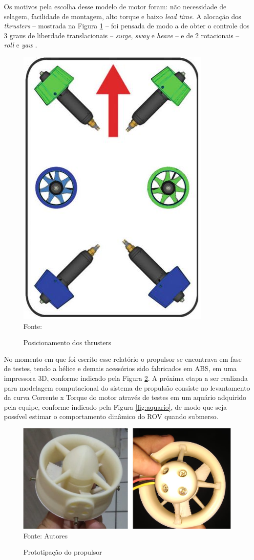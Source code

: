 Os motivos pela escolha desse modelo de motor foram: não necessidade de selagem, facilidade de montagem, alto torque e baixo \textit{lead time}. A alocação dos \textit{thrusters} -- mostrada na Figura \ref{fig:posicionamento-thrusters} -- foi pensada de modo a de obter o controle dos 3 graus de liberdade translacionais -- \textit{surge}, \textit{sway} e \textit{heave}  -- e de 2 rotacionais  -- \textit{roll} e \textit{yaw} \cite{Antonelli2018}.

\begin{figure}[h]
	\centering
	\caption{Posicionamento dos thrusters}
	\label{fig:posicionamento-thrusters}
	\includegraphics[width=0.25\linewidth]{images/alocacao-motores}\\
	\footnotesize Fonte: \cite{Antonelli2018}
\end{figure}


No momento em que foi escrito esse relatório o propulsor se encontrava em fase de testes, tendo a hélice e demais acessórios sido fabricados em ABS, em uma impressora 3D, conforme indicado pela Figura \ref{fig:prototipacao}. A próxima etapa a ser realizada para modelagem computacional do sistema de propulsão consiste no levantamento da curva Corrente x Torque do motor através de testes em um aquário adquirido pela equipe, conforme indicado pela Figura \ref{fig:aquario}, de modo que seja possível estimar o comportamento dinâmico do ROV quando submerso. 

\begin{figure}[h]
	\centering
	\caption{Prototipação do propulsor}
	\label{fig:prototipacao}
	\includegraphics[width=0.8\linewidth]{images/prototipacao}\\
	\footnotesize Fonte: Autores
\end{figure}


